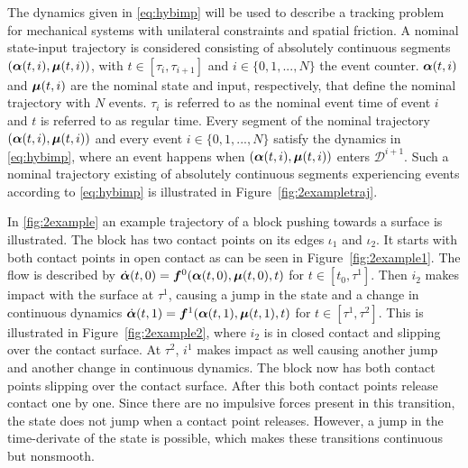 \documentclass[../DC2017114Bouma.tex]{subfiles}
\begin{document}
The dynamics given in \eqref{eq:hybimp} will be used to describe a tracking problem for mechanical systems with unilateral constraints and spatial friction. A nominal state-input trajectory is considered consisting of absolutely continuous segments $(\boldsymbol{\alpha}(t,i),\boldsymbol{\mu}(t,i))$, with $t\in\left[\tau_i,\tau_{i+1}\right]$ and $i\in\{0,1,...,N\}$ the event counter. $\boldsymbol{\alpha}(t,i)$ and $\boldsymbol{\mu}(t,i)$ are the nominal state and input, respectively, that define the nominal trajectory with $N$ events. $\tau_i$ is referred to as the nominal event time of event $i$ and $t$ is referred to as regular time. Every segment of the nominal trajectory $(\boldsymbol{\alpha}(t,i),\boldsymbol{\mu}(t,i))$ and every event $i\in\{0,1,...,N\}$ satisfy the dynamics in \eqref{eq:hybimp}, where an event happens when $(\boldsymbol{\alpha}(t,i),\boldsymbol{\mu}(t,i))$ enters $\mathcal{D}^{i+1}$. Such a nominal trajectory existing of absolutely continuous segments experiencing events according to \eqref{eq:hybimp} is illustrated in Figure~\ref{fig:2exampletraj}.

In \ref{fig:2example} an example trajectory of a block pushing towards a surface is illustrated. The block has two contact points on its edges $\iota_1$ and $\iota_2$. It starts with both contact points in open contact as can be seen in Figure~\ref{fig:2example1}. The flow is described by $\dot{\boldsymbol{\alpha}}(t,0) = {\boldsymbol{f}}^0(\boldsymbol{\alpha}(t,0),\boldsymbol{\mu}(t,0),t)$ for $t\in[t_0,\tau^1]$. Then $i_2$ makes impact with the surface at $\tau^1$, causing a jump in the state and a change in continuous dynamics $\dot{\boldsymbol{\alpha}}(t,1) = {\boldsymbol{f}}^1(\boldsymbol{\alpha}(t,1),\boldsymbol{\mu}(t,1),t)$ for $t\in[\tau^1,\tau^2]$. This is illustrated in Figure~\ref{fig:2example2}, where $i_2$ is in closed contact and slipping over the contact surface. At $\tau^2$, $i^1$ makes impact as well causing another jump and another change in continuous dynamics. The block now has both contact points slipping over the contact surface. After this both contact points release contact one by one. Since there are no impulsive forces present in this transition, the state does not jump when a contact point releases. However, a jump in the time-derivate of the state is possible, which makes these transitions continuous but nonsmooth.
\end{document}
